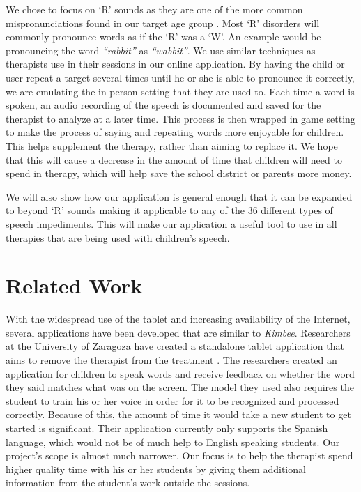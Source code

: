 \documentclass{sig-alternate-2013}
\begin{document}
We chose to focus on `R' sounds as they are one of the more common mispronunciations found in our target age group \cite{Dodd:Children}. Most `R' disorders will commonly pronounce words as if the `R' was a `W'. An example would be pronouncing the word {\em ``rabbit''} as {\em ``wabbit''}. We use similar techniques as therapists use in their sessions in our online application. By having the child or user repeat a target several times until he or she is able to pronounce it correctly, we are emulating the in person setting that they are used to. Each time a word is spoken, an audio recording of the speech is documented and saved for the therapist to analyze at a later time. This process is then wrapped in game setting to make the process of saying and repeating words more enjoyable for children. This helps supplement the therapy, rather than aiming to replace it. We hope that this will cause a decrease in the amount of time that children will need to spend in therapy, which will help save the school district or parents more money.

We will also show how our application is general enough that it can be expanded to beyond `R' sounds making it applicable to any of the 36 different types of speech impediments. This will make our application a useful tool to use in all therapies that are being used with children's speech.

\section{Related Work}

With the widespread use of the tablet and increasing availability of the Internet, several applications have been developed that are similar to {\em Kimbee}. Researchers at the University of Zaragoza have created a standalone tablet application that aims to remove the therapist from the treatment \cite{Carlos:Vocaliza}. The researchers created an application for children to speak words and receive feedback on whether the word they said matches what was on the screen. The model they used also requires the student to train his or her voice in order for it to be recognized and processed correctly. Because of this, the amount of time it would take a new student to get started is significant. Their application currently only supports the Spanish language, which would not be of much help to English speaking students. Our project's scope is almost much narrower. Our focus is to help the therapist spend higher quality time with his or her students by giving them additional information from the student's work outside the sessions.
\end{document}
